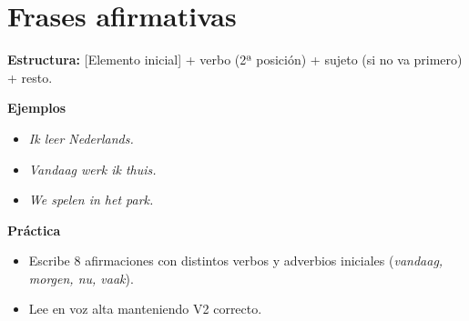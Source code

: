 \section{Frases afirmativas}
\textbf{Estructura:} [Elemento inicial] + verbo (2ª posición) + sujeto (si no va primero) + resto.

\textbf{Ejemplos}
\begin{itemize}[leftmargin=*]
  \item \textit{Ik leer Nederlands.}
  \item \textit{Vandaag werk ik thuis.}
  \item \textit{We spelen in het park.}
\end{itemize}

\textbf{Práctica}
\begin{itemize}[leftmargin=*]
  \item Escribe 8 afirmaciones con distintos verbos y adverbios iniciales (\textit{vandaag, morgen, nu, vaak}).
  \item Lee en voz alta manteniendo V2 correcto.
\end{itemize}
